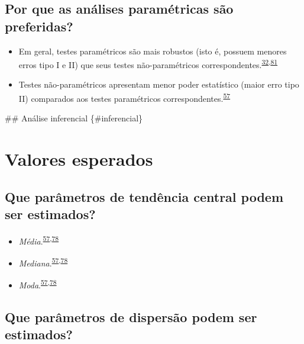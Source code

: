 \documentclass[
  a4paper,
]{book}
\begin{document}
\hypertarget{por-que-as-anuxe1lises-paramuxe9tricas-suxe3o-preferidas}{%
\subsection{Por que as análises paramétricas são preferidas?}\label{por-que-as-anuxe1lises-paramuxe9tricas-suxe3o-preferidas}}

\begin{itemize}
\item
  Em geral, testes paramétricos são mais robustos (isto é, possuem menores erros tipo I e II) que seus testes não-paramétricos correspondentes.\textsuperscript{\protect\hyperlink{ref-vetter2017}{32},\protect\hyperlink{ref-greenhalgh1997}{81}}
\item
  Testes não-paramétricos apresentam menor poder estatístico (maior erro tipo II) comparados aos testes paramétricos correspondentes.\textsuperscript{\protect\hyperlink{ref-Ali2016}{57}}
\end{itemize}

\#\# Análise inferencial \{\#inferencial\}

\hypertarget{valores-esperados}{%
\section{Valores esperados}\label{valores-esperados}}

\hypertarget{que-paruxe2metros-de-tenduxeancia-central-podem-ser-estimados}{%
\subsection{Que parâmetros de tendência central podem ser estimados?}\label{que-paruxe2metros-de-tenduxeancia-central-podem-ser-estimados}}

\begin{itemize}
\item
  \emph{Média}.\textsuperscript{\protect\hyperlink{ref-Ali2016}{57},\protect\hyperlink{ref-kanji2006}{78}}
\item
  \emph{Mediana}.\textsuperscript{\protect\hyperlink{ref-Ali2016}{57},\protect\hyperlink{ref-kanji2006}{78}}
\item
  \emph{Moda}.\textsuperscript{\protect\hyperlink{ref-Ali2016}{57},\protect\hyperlink{ref-kanji2006}{78}}
\end{itemize}

\hypertarget{que-paruxe2metros-de-dispersuxe3o-podem-ser-estimados}{%
\subsection{Que parâmetros de dispersão podem ser estimados?}\label{que-paruxe2metros-de-dispersuxe3o-podem-ser-estimados}}
\end{document}
